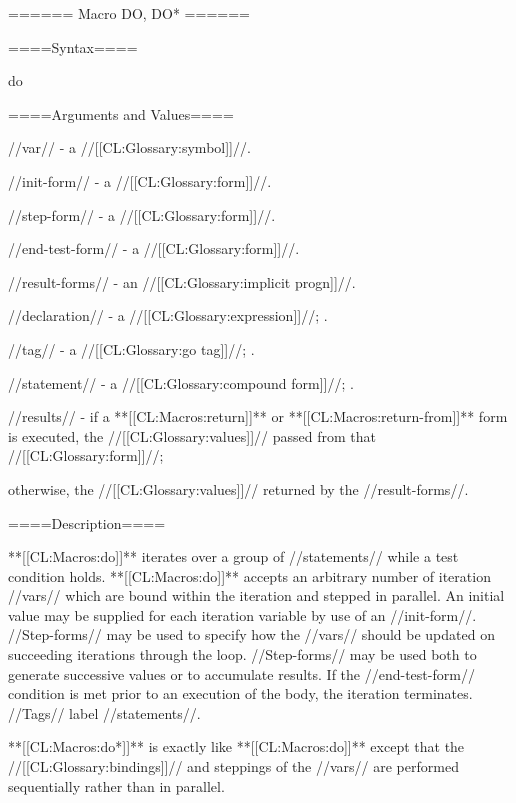 ====== Macro DO, DO* ======

====Syntax====

\DefmacWithValuesNewline do {} {}

 {} {}

====Arguments and Values====

//var// - a //[[CL:Glossary:symbol]]//.

//init-form// - a //[[CL:Glossary:form]]//.

//step-form// - a //[[CL:Glossary:form]]//.

//end-test-form// - a //[[CL:Glossary:form]]//.

//result-forms// - an //[[CL:Glossary:implicit progn]]//.

//declaration// - a  //[[CL:Glossary:expression]]//; \noeval.

//tag// - a //[[CL:Glossary:go tag]]//; \noeval.

//statement// - a //[[CL:Glossary:compound form]]//; \evalspecial.

//results// - if a **[[CL:Macros:return]]** or **[[CL:Macros:return-from]]** form is executed, the //[[CL:Glossary:values]]// passed from that //[[CL:Glossary:form]]//;

otherwise, the //[[CL:Glossary:values]]// returned by the //result-forms//.

====Description====

**[[CL:Macros:do]]** iterates over a group of //statements// while a test condition holds. **[[CL:Macros:do]]** accepts an arbitrary number of iteration //vars// which are bound within the iteration and stepped in parallel. An initial value may be supplied for each iteration variable by use of an //init-form//. //Step-forms// may be used to specify how the //vars// should be updated on succeeding iterations through the loop. //Step-forms// may be used both to generate successive values or to accumulate results. If the //end-test-form// condition is met prior to an execution of the body, the iteration terminates. //Tags// label //statements//.

**[[CL:Macros:do*]]** is exactly like **[[CL:Macros:do]]** except that the //[[CL:Glossary:bindings]]// and steppings of the //vars// are performed sequentially rather than in parallel.

